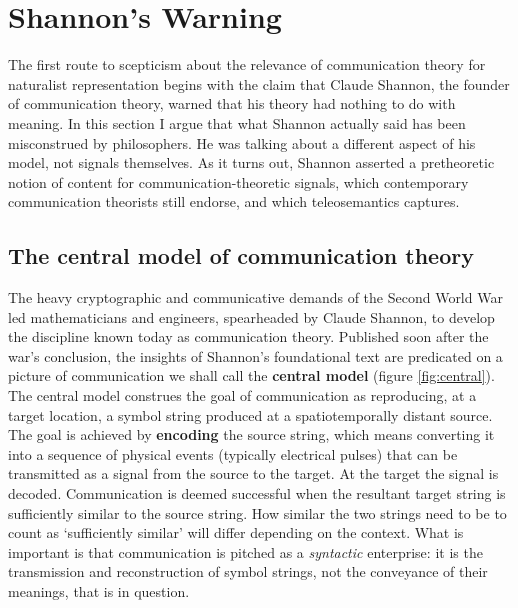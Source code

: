 
\section{Shannon's Warning}\label{sec:warning}

The first route to scepticism about the relevance of communication theory for naturalist representation begins with the claim that Claude Shannon, the founder of communication theory, warned that his theory had nothing to do with meaning.
In this section I argue that what Shannon actually said has been misconstrued by philosophers.
He was talking about a different aspect of his model, not signals themselves.
As it turns out, Shannon asserted a pretheoretic notion of content for communication-theoretic signals, which contemporary communication theorists still endorse, and which teleosemantics captures.

\subsection{The central model of communication theory}\label{subsec:central}


The heavy cryptographic and communicative demands of the Second World War led mathematicians and engineers, spearheaded by Claude Shannon, to develop the discipline known today as communication theory.
Published soon after the war's conclusion, the insights of Shannon's foundational text \parencite*{shannon1948mathematicalc} are predicated on a picture of communication we shall call the \textbf{central model} (figure \ref{fig:central}).
The central model construes the goal of communication as reproducing, at a target location, a symbol string produced at a spatiotemporally distant source.
The goal is achieved by \textbf{encoding} the source string, which means converting it into a sequence of physical events (typically electrical pulses) that can be transmitted as a signal from the source to the target.
At the target the signal is decoded.
Communication is deemed successful when the resultant target string is sufficiently similar to the source string.
How similar the two strings need to be to count as `sufficiently similar' will differ depending on the context.
What is important is that communication is pitched as a \textit{syntactic} enterprise: it is the transmission and reconstruction of symbol strings, not the conveyance of their meanings, that is in question.

